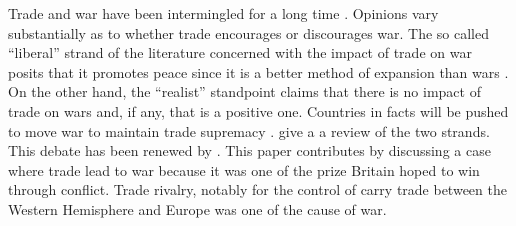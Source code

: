 \documentclass[12pt,a4paper,notitlepage,english]{article}
\begin{document}
Trade and war have been intermingled for a long time \cite{Findlay2007}.
Opinions vary substantially as to whether trade encourages or discourages war.
The so called ``liberal'' strand of the literature concerned with the impact of trade on war posits that it promotes peace since it is a better method of expansion than wars \citep{Doyle1997,Oneal1997,Polachek1980}.
On the other hand, the ``realist'' standpoint claims that there is no impact of trade on wars and, if any, that is a positive one.
Countries in facts will be pushed to move war to maintain trade supremacy \citep{Ripsman1996,Levy1990,Buzan1984}.
\cite{Mcmillan1997} give a a review of the two strands.
This debate has been renewed by  \cite{Martin2008,Martin2008a}.
This paper contributes by discussing a case where trade lead to war because it was one of the prize Britain hoped to win through conflict. Trade rivalry, notably for the control of carry trade between the Western Hemisphere and Europe was one of the cause of war.

%
\end{document}
